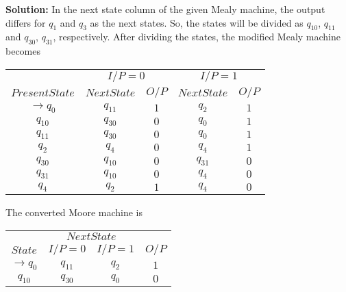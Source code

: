 \documentclass{article}
\begin{document}
\vspace*{0.3cm}

\textbf{Solution:} In the next state column of the given Mealy machine, the output differs for $q_1$ and $q_3$ as
the next states. So, the states will be divided as $q_10$, $q_11$ and $q_30$, $q_31$, respectively. After dividing the
states, the modified Mealy machine becomes\\

\begin{center}
\begin{tabular}{ccccc}
 \hline

 \hline

 \hline

 \hline
 &  \multicolumn{2}{c}{$I/P = 0$ } &  \multicolumn{2}{c}{$I/P = 1$}  \\
  \cline{2-3}                         \cline{4-5}
 $Present State$ &   $Next State$  & $O/P$ &  $Next State$  & $O/P$\\
\hline
$\rightarrow q_0$  &  $q_11$  &  $1$  &  $q_2$  & $1$ \\
$q_10$             &  $q_30$  &  $0$  &  $q_0$  & $1$ \\
$q_11$             &  $q_30$  &  $0$  &  $q_0$  & $1$ \\
$q_2$             &  $q_4$    &  $0$  &  $q_4$  & $1$ \\
$q_30$            &  $q_10$   &  $0$  &  $q_31$ & $0$ \\
$q_31$            &  $q_10$   &  $0$  &  $q_4$  & $0$ \\
$q_4$             &  $q_2$    &  $1$  &  $q_4$  & $0$ \\
 \hline

 \hline

 \hline

 \hline
\end{tabular}
\end{center}

\vspace*{0.3cm}
The converted Moore machine is\\

\vspace*{0.3cm}

\begin{center}
\begin{tabular}{cccc}
 \hline

 \hline

 \hline

 \hline
 & \multicolumn{2}{c}{$Next State$ }\\
 \cline{2-3}
 $State$ &  $I/P=0$ & $I/P=1$  &  $O/P$\\
\hline
$\rightarrow q_0$   &    $q_11$   &  $q_2$   &  $1$ \\
$q_10$              &    $q_30$   &  $q_0$   &  $0$ \\

 \hline

\end{tabular}
\end{center}
\end{document}
